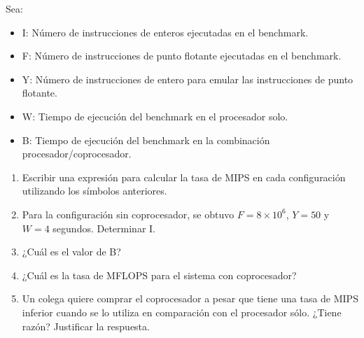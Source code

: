 Sea:

\begin{itemize}
 \item I: Número de instrucciones de enteros ejecutadas en el benchmark.
 \item F: Número de instrucciones de punto flotante ejecutadas en el benchmark.
 \item Y: Número de instrucciones de entero para emular las instrucciones de punto flotante.
 \item W: Tiempo de ejecución del benchmark en el procesador solo.
 \item B: Tiempo de ejecución del benchmark en la combinación procesador/coprocesador.
\end{itemize}

\begin{enumerate}
 \item Escribir una expresión para calcular la tasa de MIPS en cada configuración utilizando los símbolos anteriores.
 \item Para la configuración sin coprocesador, se obtuvo $F = 8 \times 10^6$, $Y = 50$ y $W = 4$ segundos. Determinar I.
 \item ¿Cuál es el valor de B?
 \item ¿Cuál es la tasa de MFLOPS para el sistema con coprocesador?
 \item Un colega quiere comprar el coprocesador a pesar que tiene una tasa de MIPS inferior cuando se lo utiliza en comparación con el procesador sólo. ¿Tiene razón? Justificar la respuesta.
\end{enumerate}


